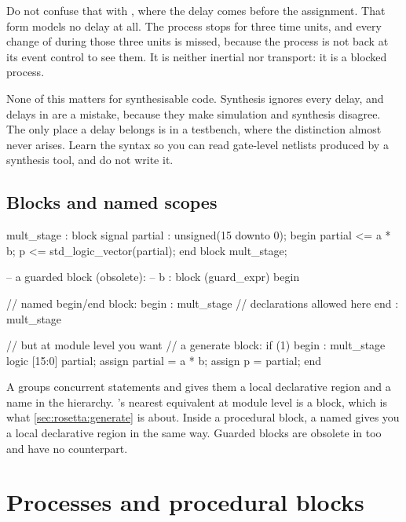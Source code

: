 Do not confuse that with , where the delay comes before the
assignment. That form models no delay at all. The process stops for three time
units, and every change of  during those three units is missed, because
the process is not back at its event control to see them. It is neither
inertial nor transport: it is a blocked process.

None of this matters for synthesisable code. Synthesis ignores every delay, and
delays in \RTL{} are a mistake, because they make simulation and synthesis
disagree. The only place a delay belongs is in a testbench, where the
distinction almost never arises. Learn the syntax so you can read gate-level
netlists produced by a synthesis tool, and do not write it.

\subsection{Blocks and named scopes}

\begin{rosetta}
\begin{rleft}
mult_stage : block
  signal partial : unsigned(15 downto 0);
begin
  partial <= a * b;
  p <= std_logic_vector(partial);
end block mult_stage;

-- a guarded block (obsolete):
-- b : block (guard_expr) begin
\end{rleft}
\begin{rright}
// named begin/end block:
begin : mult_stage
  // declarations allowed here
end : mult_stage

// but at module level you want
// a generate block:
if (1) begin : mult_stage
  logic [15:0] partial;
  assign partial = a * b;
  assign p       = partial;
end
\end{rright}
\end{rosetta}

A \VHDL{}  groups concurrent statements and gives them a local
declarative region and a name in the hierarchy. \SV{}'s nearest equivalent at
module level is a  block, which is what
\cref{sec:rosetta:generate} is about. Inside a procedural block, a named
 gives you a local declarative region in
the same way. Guarded blocks are obsolete in \VHDL{} too and have no \SV{}
counterpart.

\section{Processes and procedural blocks}
\label{sec:rosetta:processes}

